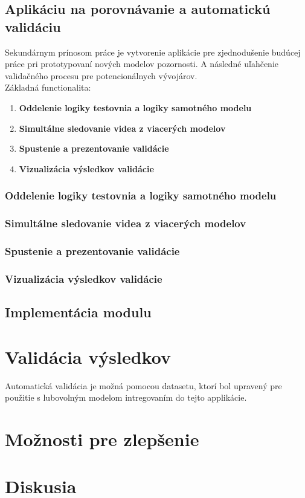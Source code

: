 \subsection{Aplikáciu na porovnávanie a automatickú validáciu}
Sekundárnym prínosom práce je vytvorenie aplikácie pre zjednodušenie budúcej práce pri prototypovaní nových modelov pozornosti.
A následné uľahčenie validačného procesu pre potencionálnych vývojárov.\\
Základná functionalita:
\begin{enumerate}
  \item\textbf{Oddelenie logiky testovnia a logiky samotného modelu}
  \item\textbf{Simultálne sledovanie videa z viacerých modelov}
  \item\textbf{Spustenie a prezentovanie validácie}
  \item\textbf{Vizualizácia výsledkov validácie}
\end{enumerate}

\subsubsection{Oddelenie logiky testovnia a logiky samotného modelu}
\subsubsection{Simultálne sledovanie videa z viacerých modelov}
\subsubsection{Spustenie a prezentovanie validácie}
\subsubsection{Vizualizácia výsledkov validácie}

\subsection{Implementácia modulu}

\section{Validácia výsledkov}
Automatická validácia je možná pomocou datasetu\cite{accv}, ktorí bol upravený pre použitie s lubovolným modelom intregovaním do tejto applikácie.
\section{Možnosti pre zlepšenie}
\section{Diskusia}
